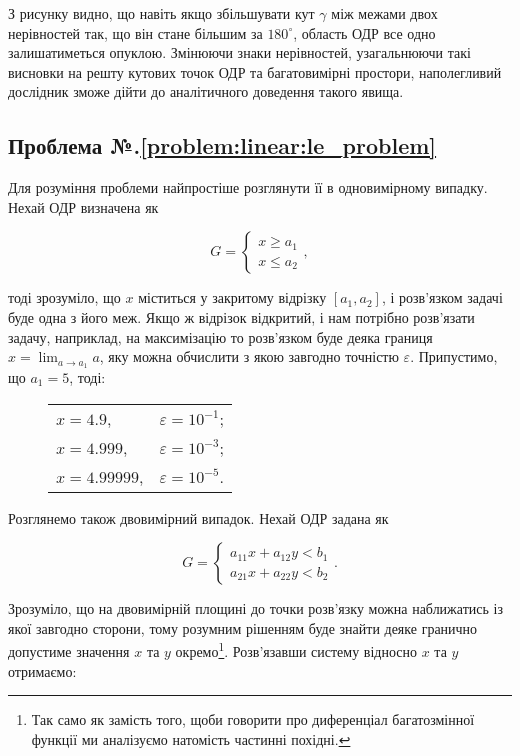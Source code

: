 \documentclass[\main/book.tex]{subfiles}
\begin{document}
З рисунку видно, що навіть якщо збільшувати кут $\gamma$ між межами двох нерівностей так, що він стане більшим за $180^\circ$, область ОДР все одно залишатиметься опуклою. Змінюючи знаки нерівностей, узагальнюючи такі висновки на решту кутових точок ОДР та багатовимірні простори, наполегливий дослідник зможе дійти до аналітичного доведення такого явища.

\subsection*{Проблема №.\ref{problem:linear:le_problem}}

Для розуміння проблеми найпростіше розглянути її в одновимірному випадку. Нехай ОДР визначена як

\[
 G = \left\{
  \begin{array}{l}
   x \geq a_1 \\
   x \leq a_2
  \end{array}
 \right.,
\]

тоді зрозуміло, що $x$ міститься у закритому відрізку $[a_1, a_2]$, і розв'язком задачі буде одна з його меж. Якщо ж відрізок відкритий, і нам потрібно розв'язати задачу, наприклад, на максимізацію то розв'язком буде деяка границя $x = \displaystyle \lim_{a \to a_1} a$, яку можна обчислити з якою завгодно точністю $\varepsilon$. Припустимо, що $a_1 = 5$, тоді:

\begin{figure}[!h]
 \center
 \begin{tabular}{ll}
  $x = 4.9$,     & $\varepsilon = 10^{-1}$; \\
  $x = 4.999$,   & $\varepsilon = 10^{-3}$; \\
  $x = 4.99999$, & $\varepsilon = 10^{-5}$.
 \end{tabular}
\end{figure}

Розглянемо також двовимірний випадок. Нехай ОДР задана як

\[
 G = \left\{
  \begin{array}{l}
   a_{11} x + a_{12} y < b_1 \\
   a_{21} x + a_{22} y < b_2
  \end{array}
 \right..
\]

Зрозуміло, що на двовимірній площині до точки розв'язку можна наближатись із якої завгодно сторони, тому розумним рішенням буде знайти деяке гранично допустиме значення $x$ та $y$ окремо\footnote{Так само як замість того, щоби говорити про диференціал багатозмінної функції ми аналізуємо натомість частинні похідні.}. Розв'язавши систему відносно $x$ та $y$ отримаємо:
\end{document}
